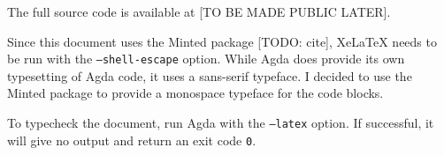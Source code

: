 \documentclass[logo,bsc,singlespacing,parskip,online]{infthesis}
\begin{document}
The full source code is available at [TO BE MADE PUBLIC LATER].

Since this document uses the Minted package [TODO: cite], XeLaTeX needs to be run with the
\texttt{--shell-escape} option. While Agda does provide its own typesetting of Agda code, it uses a
sans-serif typeface. I decided to use the Minted package to provide a monospace typeface for the
code blocks.

To typecheck the document, run Agda with the \texttt{--latex} option. If successful, it will give no
output and return an exit code \texttt{0}.
\end{document}
